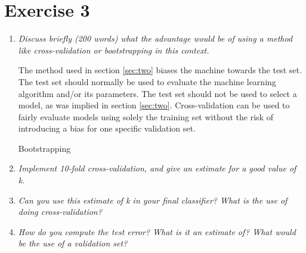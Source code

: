 \documentclass[a4paper,11pt]{article}
\begin{document}
\section*{Exercise 3}
\begin{enumerate}
    \item \textit{Discuss briefly (200 words) what the advantage would be of using a method like cross-validation or
bootstrapping in this context.}

The method used in section \ref{sec:two} biases the machine towards the test set. The test set should normally be
used to evaluate the machine learning algorithm and/or its parameters. The test set should not be used to 
select a model, as was implied in section \ref{sec:two}. 
Cross-validation can be used to fairly evaluate models using solely the training set without the risk of 
introducing a bias for one specific validation set. 

Bootstrapping 

\item \textit{Implement 10-fold cross-validation, and give an estimate for a good value of k.}

\item \textit{Can you use this estimate of k in your ﬁnal classiﬁer? What is the use of doing cross-validation?}

\item \textit{ How do you compute the test error? What is it an estimate of? What would be the use of a validation
set? }



\end{enumerate}
\end{document}
